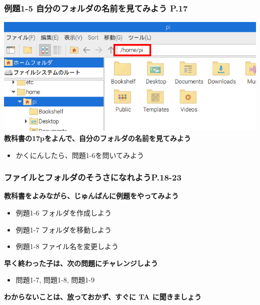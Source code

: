 \documentclass[dvipdfmx]{beamer}
\begin{document}
\begin{frame}[fragile]
	\frametitle{例題1-5 自分のフォルダの名前を見てみよう P.17~~~}
    \includegraphics[width=\textwidth]{slide02_004.png}
    \vfill
    \large\textbf{教科書の17pをよんで、自分のフォルダの名前を見てみよう}
    \begin{itemize}
      \item かくにんしたら、問題1-6を問いてみよう
    \end{itemize}
\end{frame}

\begin{frame}[fragile]
	\frametitle{ファイルとフォルダのそうさになれようP.18-23~~~}
      \large\textbf{教科書をよみながら、じゅんばんに例題をやってみよう}
				\begin{itemize}
					\item 例題1-6 フォルダを作成しよう
					\item 例題1-7 フォルダを移動しよう
					\item 例題1-8 ファイル名を変更しよう
				\end{itemize}
      \vfill
      \large\textbf{早く終わった子は、次の問題にチャレンジしよう}
      \begin{itemize}
        \item 問題1-7, 問題1-8, 問題1-9
      \end{itemize}
      \vfill
      \large\textbf{わからないことは、放っておかず、すぐに TA に聞きましょう}
\end{frame}
\end{document}
